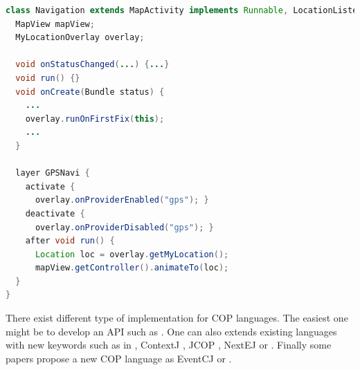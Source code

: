\documentclass[a4paper]{article}
\begin{document}
\begin{lstlisting}[float, language=Java, caption=EventCJ context-dependent behaviour, label={listing:eventcjlayeruse}]
class Navigation extends MapActivity implements Runnable, LocationListener {
  MapView mapView;
  MyLocationOverlay overlay;
    
  void onStatusChanged(...) {...}
  void run() {}
  void onCreate(Bundle status) {
    ...
    overlay.runOnFirstFix(this);
    ...
  }
  
  layer GPSNavi {
    activate {
      overlay.onProviderEnabled("gps"); }
    deactivate {
      overlay.onProviderDisabled("gps"); }
    after void run() {
      Location loc = overlay.getMyLocation();
      mapView.getController().animateTo(loc);
  }
}
\end{lstlisting}

There exist different type of implementation for COP languages. The easiest one might be to develop an API such as \cite{appeltauer_dedicated_2008}. One can also extends existing languages with new keywords such as in \cite{clarke_semantics_2009}, ContextJ \cite{haupt_contextj:_2011}, JCOP \cite{appeltauer_declarative_2013}, NextEJ \cite{kamina_towards_2009} or \cite{ghezzi_context_2010}. Finally some papers propose a new COP language as  EventCJ \cite{kamina_eventcj:_2011} or \cite{kamina_unified_2013}.
\end{document}
